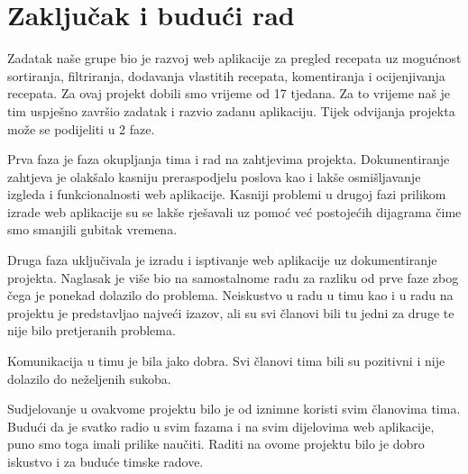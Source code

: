 \chapter{Zaključak i budući rad}
		
	\text
	Zadatak naše grupe bio je razvoj web aplikacije za pregled recepata uz mogućnost sortiranja, 
	filtriranja, dodavanja vlastitih recepata, komentiranja i ocijenjivanja recepata. Za ovaj projekt dobili smo vrijeme od 17 tjedana.
	Za to vrijeme naš je tim uspješno završio zadatak i razvio zadanu aplikaciju. Tijek odvijanja projekta može se podijeliti u 2 faze.

	\text
	Prva faza je faza okupljanja tima i rad na zahtjevima projekta. Dokumentiranje zahtjeva je olakšalo kasniju preraspodjelu poslova
	kao i lakše osmišljavanje izgleda i funkcionalnosti web aplikacije. Kasniji problemi u drugoj fazi prilikom izrade web aplikacije 
	su se lakše rješavali uz pomoć već postojećih dijagrama čime smo smanjili gubitak vremena.

	\text
	Druga faza uključivala je izradu i isptivanje web aplikacije uz dokumentiranje projekta. Naglasak je više bio na samostalnome radu
	za razliku od prve faze zbog čega je ponekad dolazilo do problema. Neiskustvo u radu u timu kao i u radu na projektu je predstavljao
	najveći izazov, ali su svi članovi bili tu jedni za druge te nije bilo pretjeranih problema.

	\text
	Komunikacija u timu je bila jako dobra. Svi članovi tima bili su pozitivni i nije dolazilo do neželjenih sukoba.

	\text
	Sudjelovanje u ovakvome projektu bilo je od iznimne koristi svim članovima tima. Budući da je svatko radio u svim fazama i na svim 
	dijelovima web aplikacije, puno smo toga imali prilike naučiti. Raditi na ovome projektu bilo je dobro iskustvo i za buduće
	timske radove.

	\eject